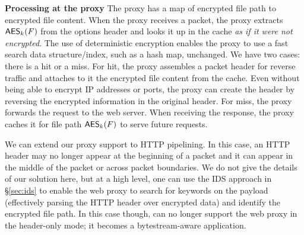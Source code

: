\noindent\textbf{Processing at the proxy} The proxy has a map of encrypted file path to encrypted file content. When the proxy receives a packet, the proxy extracts $\mathsf{AES}_k(F)$ from the options header and looks it up in the cache {\em as if it were not encrypted}. The use of deterministic encryption enables the proxy to use a fast search data structure/index, such as a hash map, unchanged. We have two cases: there is a hit or a miss. For hit, the proxy assembles a packet header for reverse traffic and attaches to it the encrypted file content from the cache. Even without being able to encrypt IP addresses or ports, the proxy can create the header by reversing the encrypted information in the original header.
For miss, the proxy forwards the request to the web server. When receiving the response, the proxy caches it for file path $\mathsf{AES}_k(F)$ to serve future requests.

We can extend our proxy support to HTTP pipelining. %
In this case,  an HTTP header may no longer appear at the beginning of a packet and it can appear in the middle of the packet or across packet boundaries. We do not give the details of our solution here, but at a high level, one can use the IDS approach in \S\ref{sec:ids} to enable the web proxy to search for keywords on the payload  (effectively parsing the HTTP header over encrypted data) and identify the encrypted file path. In this case though, \sys can no longer support the web proxy in the header-only mode; it becomes a bytestream-aware application. 


%
%
% 
%
%









%
%




